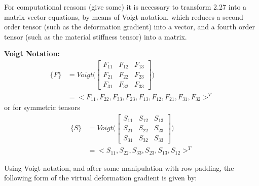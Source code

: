 For computational reasons (give some) it is necessary to transform 2.27 into a matrix-vector equations, by means of Voigt notation, which reduces a second order tensor (such as the deformation gradient) into a vector, and a fourth order tensor (such as the material stiffness tensor) into a matrix. 
\begin{tcolorbox}
\textbf{Voigt Notation:}
\begin{align*}
\{F\} &= Voigt\bigg(\begin{bmatrix}
F_{11} &F_{12} &F_{13} \\
F_{21} &F_{22} &F_{23} \\
F_{31} &F_{32} &F_{33} 
\end{bmatrix}\bigg) \\
&= <F_{11},F_{22},F_{33},F_{23},F_{13},F_{12},F_{21},F_{31},F_{32}>^T
\end{align*}
or for symmetric tensors 
\begin{align*}
\{S\} &= Voigt\bigg(\begin{bmatrix}
S_{11} &S_{12} &S_{13} \\
S_{21} &S_{22} &S_{23} \\
S_{31} &S_{32} &S_{33} 
\end{bmatrix}\bigg) \\
&= <S_{11},S_{22},S_{33},S_{23},S_{13},S_{12}>^T
\end{align*}
\end{tcolorbox}
Using Voigt notation, and after some manipulation with row padding, the following form of the virtual deformation gradient is given by:
